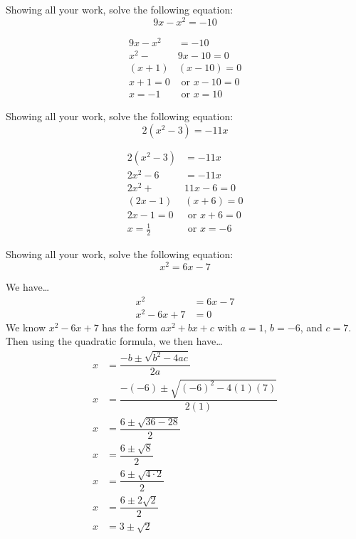 \documentclass[11pt,letterpaper]{article}
\begin{document}
\newpage



 Showing all your work, solve the following equation:
	\[
	9x - x^2= -10
	\] \pspace

\sol
	\[
	\begin{aligned}
	9x - x^2&= -10 \\[0.3cm]
	x^2 - &9x - 10= 0 \\[0.3cm]
	(x + 1)&(x - 10)= 0 \\[0.3cm]
	x + 1= 0 &\text{  or  } x - 10= 0 \\[0.3cm]
	x= -1 &\text{  or  } x= 10 
	\end{aligned}
	\]



\newpage



 Showing all your work, solve the following equation:
	\[
	2(x^2 - 3)= -11x
	\] \pspace

\sol
	\[
	\begin{aligned}
	2(x^2 - 3)&= -11x \\[0.3cm]
	2x^2 - 6&= -11x \\[0.3cm]
	2x^2 + &11x - 6= 0 \\[0.3cm]
	(2x - 1)&(x + 6)= 0 \\[0.3cm]
	2x - 1= 0 &\text{  or  } x + 6= 0 \\[0.3cm]
	x= \tfrac{1}{2} &\text{  or  } x= -6
	\end{aligned}
	\]



\newpage



 Showing all your work, solve the following equation:
	\[
	x^2= 6x - 7
	\] \pspace

\sol We have\dots \pspace
	\[
	\begin{aligned}
	x^2&= 6x - 7 \\[0.3cm]
	x^2 - 6x + 7&= 0 
	\end{aligned}
	\] \pspace
We know $x^2 - 6x + 7$ has the form $ax^2 + bx + c$ with $a= 1$, $b= -6$, and $c= 7$. Then using the quadratic formula, we then have\dots \pspace
	\[
	\begin{aligned}
	x&= \dfrac{-b \pm \sqrt{b^2 - 4ac}}{2a} \\[0.3cm]
	x&= \dfrac{-(-6) \pm \sqrt{(-6)^2 - 4(1)(7)}}{2(1)} \\[0.3cm]
	x&= \dfrac{6 \pm \sqrt{36 - 28}}{2} \\[0.3cm]
	x&= \dfrac{6 \pm \sqrt{8}}{2} \\[0.3cm]
	x&= \dfrac{6 \pm \sqrt{4 \cdot 2}}{2} \\[0.3cm]
	x&= \dfrac{6 \pm 2\sqrt{2}}{2} \\[0.3cm]
	x&= 3 \pm \sqrt{2}
	\end{aligned}
	\] 
\end{document}
